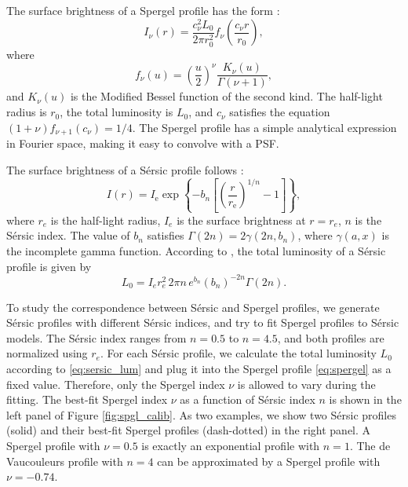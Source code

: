 \documentclass[twocolumn,astrosymb,twocolappendix]{aastex631}
\newcommand{\sersic}{S\'ersic}
\begin{document}
\begin{CJK*}{UTF8}{gbsn}
The surface brightness of a Spergel profile has the form \citep{Spergel2010}:
\begin{equation}
    \label{eq:spergel}
    I_\nu(r) = \frac{c_{\nu}^{2} L_{0}}{2\pi r_{0}^{2}} f_{\nu}\left(\frac{c_{\nu} r}{r_{0}}\right),
\end{equation}
where 
\begin{equation}
    f_{\nu}(u)=\left(\frac{u}{2}\right)^{\nu} \frac{K_{\nu}(u)}{\Gamma(\nu+1)},
\end{equation}
and $K_\nu(u)$ is the Modified Bessel function of the second kind. The half-light radius is $r_0$, the total luminosity is $L_0$, and $c_\nu$ satisfies the equation $(1 + \nu)f_{\nu + 1}(c_\nu) = 1/4$. The Spergel profile has a simple analytical expression in Fourier space, making it easy to convolve with a PSF.

The surface brightness of a \sersic{} profile follows \citep{Sersic1963,Graham2005}:
\begin{equation}\label{eq:sersic}
    I(r)=I_{\mathrm{e}} \exp \left\{-b_{n}\left[\left(\frac{r}{r_{\mathrm{e}}}\right)^{1 / n}-1\right]\right\},
\end{equation}
where $r_e$ is the half-light radius, $I_e$ is the surface brightness at $r=r_e$, $n$ is the \sersic{} index. The value of $b_n$ satisfies $\Gamma(2 n)=2 \gamma\left(2 n, b_{n}\right)$, where $\gamma(a, x)$ is the incomplete gamma function. According to \citet{Graham2005}, the total luminosity of a \sersic{} profile is given by 
\begin{equation}\label{eq:sersic_lum}
    L_0 = I_{e} r_{e}^{2}\, 2 \pi n\, e^{b_{n}} \left(b_{n}\right)^{-2 n} \Gamma(2 n).
\end{equation}

To study the correspondence between \sersic{} and Spergel profiles, we generate \sersic{} profiles with different \sersic{} indices, and try to fit Spergel profiles to \sersic{} models. The \sersic{} index ranges from $n=0.5$ to $n=4.5$, and both profiles are normalized using $r_e$. For each \sersic{} profile, we calculate the total luminosity $L_0$ according to \eqref{eq:sersic_lum} and plug it into the Spergel profile \eqref{eq:spergel} as a fixed value. Therefore, only the Spergel index $\nu$ is allowed to vary during the fitting. The best-fit Spergel index $\nu$ as a function of \sersic{} index $n$ is shown in the left panel of Figure \ref{fig:spgl_calib}. As two examples, we show two \sersic{} profiles (solid) and their best-fit Spergel profiles (dash-dotted) in the right panel. A Spergel profile with $\nu=0.5$ is exactly an exponential profile with $n=1$. The de Vaucouleurs profile \citep{deVaucouleurs1948} with $n=4$ can be approximated by a Spergel profile with $\nu=-0.74$. 


\end{CJK*}
\end{document}
